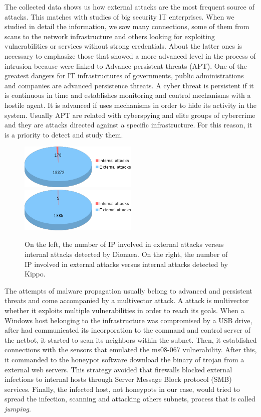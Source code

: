 \documentclass[a4paper]{llncs}
\begin{document}
The collected data shows us how external attacks are the most frequent source of attacks. This matches with studies of big security IT enterprises\cite{verizon-2015}. When we studied in detail the information, we saw many connections, some of them from scans to the network infrastructure and others looking for exploiting vulnerabilities or services without strong credentials. About the latter ones is necessary to emphasize those that showed a more advanced level in the process of intrusion because were linked to Advance persistent threats (APT). One of the greatest dangers for IT infrastructures of governments, public administrations and companies are advanced persistence threats. A cyber threat is persistent if it is continuous in time and establishes monitoring and control mechanisms with a hostile agent. It is advanced if uses mechanisms in order to hide its activity in the system. Usually APT are related with cyberspying and elite groups of cybercrime and they are attacks directed against a specific infrastructure. For this reason, it is a priority to detect and study them.

\begin{figure}[h]
	\includegraphics[width=0.5\textwidth]{dionaeaInternalExternal.png}
	\label{fig:intvsextDionaea}
	\includegraphics[width=0.5\textwidth]{kippoInternalExternal.png}
	\label{fig:intvsextKippo}
	\caption{On the left, the number of IP involved in external attacks versus internal attacks detected by Dionaea. On the right, the number of IP involved in external attacks versus internal attacks detected by Kippo.}
\end{figure}

The attempts of malware propagation usually belong to advanced and persistent threats and come accompanied by a multivector attack. A attack is multivector whether it exploits multiple vulnerabilities in order to reach its goals. When a Windows host belonging to the infrastructure was compromised by a USB drive, after had communicated its incorporation to the command and control server of the netbot, it started to scan its neighbors within the subnet. Then, it established connections with the sensors that  emulated the ms08-067\cite{ms08067} vulnerability. After this, it commanded to the honeypot software download the binary of trojan from a external web servers. This strategy avoided that firewalls blocked external infections to internal hosts through Server Message Block protocol (SMB) services. Finally, the infected host, not honeypots in our case, would tried to spread the infection, scanning and attacking others subnets, process that is called {\it jumping}.
\end{document}
